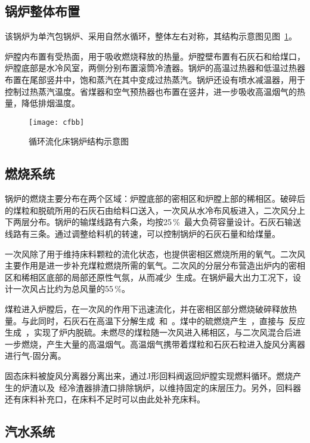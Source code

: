\subsection{锅炉整体布置}

该锅炉为单汽包锅炉、采用自然水循环，整体左右对称，其结构示意图见图~\ref{fig:cfbb}。

炉膛内布置有受热面，用于吸收燃烧释放的热量。炉膛壁布置有石灰石和给煤口，炉膛底部是水冷风室，两侧分别布置滚筒冷渣器。锅炉的高温过热器和低温过热器布置在尾部竖井中，饱和蒸汽在其中变成过热蒸汽。锅炉还设有喷水减温器，用于控制过热蒸汽温度。省煤器和空气预热器也布置在竖井，进一步吸收高温烟气的热量，降低排烟温度。

\begin{figure}[!htb]
\centering
\texttt{[image: cfbb]}
\caption{循环流化床锅炉结构示意图} \label{fig:cfbb}
\end{figure}

\subsection{燃烧系统}

锅炉的燃烧主要分布在两个区域：炉膛底部的密相区和炉膛上部的稀相区。破碎后的煤粒和脱硫所用的石灰石由给料口送入，一次风从水冷布风板进入，二次风分上下两层分布。锅炉的输煤线路有六条，均按25$\,$\si{\percent}~最大负荷容量设计。石灰石输送线路有三条。通过调整给料机的转速，可以控制锅炉的石灰石量和给煤量。

一次风除了用于维持床料颗粒的流化状态，也提供密相区燃烧所用的氧气。二次风主要作用是进一步补充煤粒燃烧所需的氧气。二次风的分层分布营造出炉内的密相区和稀相区底部的局部还原性气氛，从而减少~生成。在锅炉最大出力工况下，设计一次风占比约为总风量的55$\,$\si{\percent}。

煤粒进入炉膛后，在一次风的作用下迅速流化，并在密相区部分燃烧破碎释放热量。与此同时，石灰石在高温下分解生成~和~。煤中的硫燃烧产生~，直接与~反应生成~，实现了炉内脱硫。未燃尽的煤粒随一次风进入稀相区，与二次风混合后进一步燃烧，产生大量的高温烟气。高温烟气携带着煤粒和石灰石粒进入旋风分离器进行气-固分离。

固态床料被旋风分离器分离出来，通过J形回料阀返回炉膛实现燃料循环。燃烧产生的炉渣以及~经冷渣器排渣口排除锅炉，以维持固定的床层压力。另外，回料器还有床料补充口，在床料不足时可以由此处补充床料。


\subsection{汽水系统}

